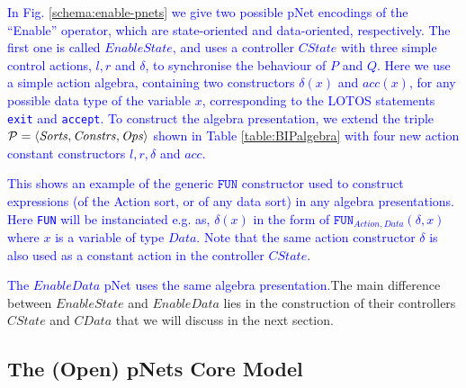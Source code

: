 \documentclass[smallcondensed]{svjour3}
\newcommand{\ERIC}[1]{\textcolor{blue}{#1}}
\newcommand{\QIN}[1]{\textcolor{airforceblue}{#1}}
\newcommand{\YX}[1]{{\color{red}#1}}
\begin{document}
\begin{example}\label{example:EnableOperator}
\ERIC{In Fig. \ref{schema:enable-pnets} we give two possible pNet  encodings of the ``Enable'' operator, \YX{which are  state-oriented and data-oriented, respectively.} 
The first one is called $EnableState$, and uses a controller $CState$ with three simple control actions, $l, r$ and $\delta$,  to synchronise the behaviour of $P$ and $Q$. Here we use a simple action algebra, containing two constructors $\delta(x)$ and $acc(x)$, for any possible data type of the variable $x$, corresponding to the LOTOS statements \texttt{exit} and \texttt{accept}. To construct the algebra presentation, we extend the triple $\mathcal{P}=\langle\mathit{Sorts},\mathit{Constrs},\mathit{Ops}\rangle$ shown in Table \ref{table:BIPalgebra} with four new action constant constructors $l, r, \delta$ and $acc$.} 

\ERIC{This shows an example of the generic $\texttt{FUN}$ constructor used to construct expressions (of the Action sort, or of any data sort) in any algebra presentations.
  Here \texttt{FUN} will be instanciated e.g. as, $\delta(x)$ in the form of $\texttt{FUN}_{Action, Data}(\delta, x)$ where $x$ is a variable of type $Data$.
  Note that the same action constructor $\delta$ is also used as a constant action in the controller $CState$.
}

\ERIC{The $EnableData$ pNet uses the same algebra presentation.}\QIN{The main difference between $EnableState$ and $EnableData$ lies in the construction of their controllers $CState$ and $CData$ that we will discuss in the next section.}
\end{example}


\subsection{The (Open) pNets Core Model}
\label{section:pNets}
\end{document}
